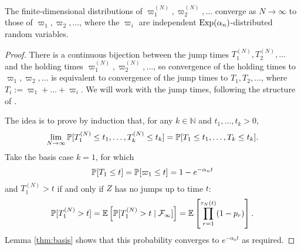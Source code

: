 \begin{lemma}\label{thm:holdingtimes_distn}
The finite-dimensional distributions of $\varpi_1^{(N)} , \varpi_2^{(N)} , \dots$ converge as $N\to\infty$ to those of $\varpi_1, \varpi_2, \dots$, where the $\varpi_i$ are independent $\operatorname{Exp}(\alpha_n)$-distributed random variables.
\end{lemma}

\begin{proof}
There is a continuous bijection between the jump times $T_1^{(N)} ,T_2^{(N)},\dots$ and the holding times $\varpi_1^{(N)}, \varpi_2^{(N)}, \dots$, so convergence of the holding times to $\varpi_1, \varpi_2,\dots$ is equivalent to convergence of the jump times to $T_1, T_2, \dots$, where $T_i := \varpi_1+\dots+\varpi_i$. 
We will work with the jump times, following the structure of \textcite[Lemma 3.2]{mohle1999}.

The idea is to prove by induction that, for any $k\in\mathbb{N}$ and $t_1,\dots,t_k >0$,
\begin{equation}\label{eq:518}
\lim_{N\to\infty} \mathbb{P}[ T_1^{(N)} \leq t_1, \dots , T_k^{(N)} \leq t_k ]
= \mathbb{P}[ T_1 \leq t_1, \dots , T_k \leq t_k ] .
\end{equation}
Take the basis case $k=1$, for which
\begin{equation*}
\mathbb{P}[ T_1 \leq t ] 
= \mathbb{P}[ \varpi_1 \leq t ] = 1 - e^{-\alpha_n t}
\end{equation*}
and $T_1^{(N)} >t$ if and only if $Z$ has no jumps up to time $t$:
\begin{equation*}
\mathbb{P}[T_1^{(N)} >t]
= \mathbb{E}\left[ \mathbb{P}[ T_1^{(N)} >t \mid \mathcal{F}_\infty ] \right]
= \mathbb{E}\left[ \prod_{r=1}^{\tau_N(t)} (1-p_r) \right] .
\end{equation*}
Lemma \ref{thm:basis} shows that this probability converges to $e^{-\alpha_n t}$ as required.


\end{proof}
